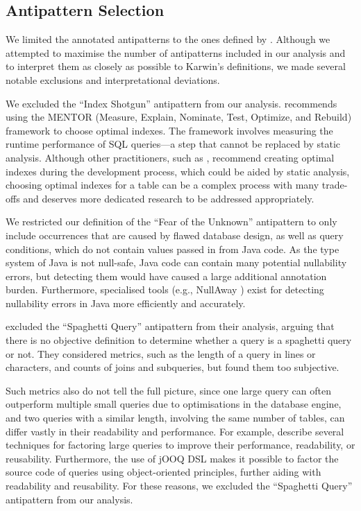 \subsection{Antipattern Selection}\label{sec:antipatternSelection}

We limited the annotated antipatterns to the ones defined by . Although we attempted to maximise the number of antipatterns included in our analysis and to interpret them as closely as possible to Karwin’s definitions, we made several notable exclusions and interpretational deviations.

We excluded the “Index Shotgun” antipattern from our analysis.  recommends using the MENTOR (Measure, Explain, Nominate, Test, Optimize, and Rebuild) framework to choose optimal indexes. The framework involves measuring the runtime performance of SQL queries—a step that cannot be replaced by static analysis. Although other practitioners, such as , recommend creating optimal indexes during the development process, which could be aided by static analysis, choosing optimal indexes for a table can be a complex process with many trade-offs and deserves more dedicated research to be addressed appropriately.

We restricted our definition of the “Fear of the Unknown” antipattern to only include occurrences that are caused by flawed database design, as well as query conditions, which do not contain values passed in from Java code. As the type system of Java is not null-safe, Java code can contain many potential nullability errors, but detecting them would have caused a large additional annotation burden. Furthermore, specialised tools (e.g., NullAway ) exist for detecting nullability errors in Java more efficiently and accurately.

 excluded the “Spaghetti Query” antipattern from their analysis, arguing that there is no objective definition to determine whether a query is a spaghetti query or not. They considered metrics, such as the length of a query in lines or characters, and counts of joins and subqueries, but found them too subjective.

Such metrics also do not tell the full picture, since one large query can often outperform multiple small queries due to optimisations in the database engine, and two queries with a similar length, involving the same number of tables, can differ vastly in their readability and performance. For example,  describe several techniques for factoring large queries to improve their performance, readability, or reusability. Furthermore, the use of jOOQ DSL makes it possible to factor the source code of queries using object-oriented principles, further aiding with readability and reusability. For these reasons, we excluded the “Spaghetti Query” antipattern from our analysis.

